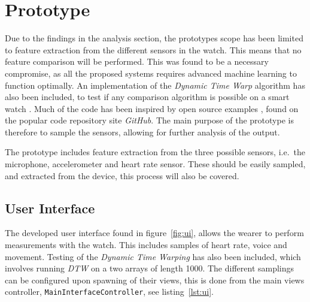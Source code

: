 \section{Prototype}
Due to the findings in the analysis section, the prototypes scope has been
limited to feature extraction from the different sensors in the watch. This means
that no feature comparison will be performed. This was found to be a necessary
compromise, as all the proposed systems requires advanced machine learning to
function optimally. An implementation of the \textit{Dynamic Time Warp}
algorithm has also been included, to test if any comparison algorithm is
possible on a smart watch \cite{berndt1994using}.
Much of the code has been inspired by open source examples 
\cite{watchosheartratesamplerepo} \cite{healthkitheartrateexporter} 
\cite{watchossampler}, found on the popular code repository site \textit{GitHub}.
The main purpose of the prototype is therefore to sample the sensors, allowing
for further analysis of the output.

The prototype includes feature extraction from the three possible sensors,
    i.e.\ the microphone, accelerometer and heart rate sensor. These should be
easily sampled, and extracted from the device, this process will also be
covered. 

\subsection{User Interface}
The developed user interface found in figure~\ref{fig:ui}, allows the wearer
to perform measurements with the watch. This includes samples of
heart rate, voice and movement. Testing of the \textit{Dynamic Time Warping} has
also been included, which involves running \textit{DTW} on a two arrays of
length 1000.
The different samplings can be configured upon spawning of their views, this is
done from the main views controller, \texttt{MainInterfaceController}, see
listing~\ref{lst:ui}.

